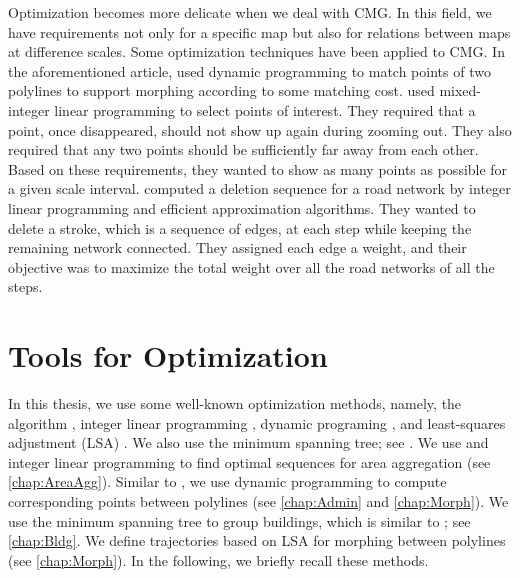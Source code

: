 Optimization becomes more delicate
when we deal with CMG.
In this field, we have requirements 
not only for a specific map
but also for relations between maps at difference scales. 
%
Some optimization techniques have been applied to CMG.
In the aforementioned article,
\textcite{Noellenburg2008} used dynamic programming
to match points of two polylines to support morphing
according to some matching cost.
\textcite{sahw-oarps-ICAGW13} used 
mixed-integer linear programming 
to select points of interest.
They required that a point, once disappeared, 
should not show up again during zooming out. 
They also required that any two points should be 
sufficiently far away from each other.
Based on these requirements, 
they wanted to show as many points as possible 
for a given scale interval.
\textcite{Chimani2014Eat} computed a deletion sequence
for a road network by integer linear programming
and efficient approximation algorithms.
They wanted to delete a stroke, 
which is a sequence of edges, at each step
while keeping the remaining network connected.
They assigned each edge a weight, 
and their objective was to maximize the total weight 
over all the road networks of all the steps.

\section{Tools for Optimization}
\label{sec:Intro_Tools}

In this thesis, we use some well-known optimization methods,
namely, the \Astar algorithm \parencite{Hart1968}, 
integer linear programming
\parencite[chapter~13]{Papadimitriou1982combinatorial},
dynamic programing \parencite[chapter~15]{Cormen2009}, and
least-squares adjustment (LSA) \parencite[chapter~3]{Koch1988}.
We also use the minimum spanning tree;
see \textcite[chapter~23]{Cormen2009}.
%
We use \Astar and integer linear programming 
to find optimal sequences for 
area aggregation (see \chap\ref{chap:AreaAgg}).
Similar to \textcite{Noellenburg2008},
we use dynamic programming to 
compute corresponding points between polylines
(see \chaps\ref{chap:Admin} and \ref{chap:Morph}).
We use the minimum spanning tree to group buildings,
which is similar to \textcite{Regnauld2001}; 
see \chap\ref{chap:Bldg}.
We define trajectories based on LSA 
for morphing between polylines (see \chap\ref{chap:Morph}).
In the following, we briefly recall these methods.


